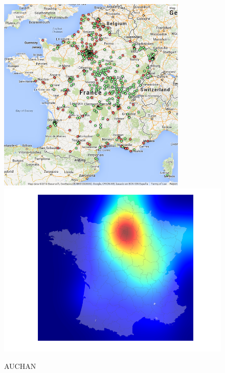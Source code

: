 \documentclass[11pt]{article}
\begin{document}
\begin{figure}[H]
    \caption{AUCHAN}
	\centering
		\includegraphics[width=9cm]{images/maps_group_dots/AUCHAN.png}
        \includegraphics[width=12.8cm]{images/maps_group_heatmaps/AUCHAN.png}
\end{figure}
\end{document}
